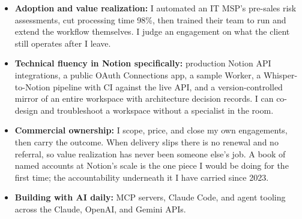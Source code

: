 \documentclass[]{cover}
\begin{document}


\currentdate{\today}




{\raggedright{}\fontsize{11pt}{13pt}\selectfont
\begin{itemize}
    \item \textbf{Adoption and value realization:} I automated an IT MSP's pre-sales risk assessments, cut processing time 98\%, then trained their team to run and extend the workflow themselves. I judge an engagement on what the client still operates after I leave.
    \item \textbf{Technical fluency in Notion specifically:} production Notion API integrations, a public OAuth Connections app, a sample Worker, a Whisper-to-Notion pipeline with CI against the live API, and a version-controlled mirror of an entire workspace with architecture decision records. I can co-design and troubleshoot a workspace without a specialist in the room.
    \item \textbf{Commercial ownership:} I scope, price, and close my own engagements, then carry the outcome. When delivery slips there is no renewal and no referral, so value realization has never been someone else's job. A book of named accounts at Notion's scale is the one piece I would be doing for the first time; the accountability underneath it I have carried since 2023.
    \item \textbf{Building with AI daily:} MCP servers, Claude Code, and agent tooling across the Claude, OpenAI, and Gemini APIs.
\end{itemize}\par}
\vspace{6pt}
\end{document}

